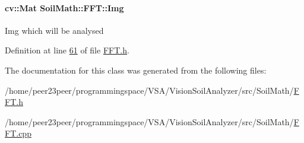 \paragraph[{Img}]{\setlength{\rightskip}{0pt plus 5cm}cv\+::\+Mat Soil\+Math\+::\+F\+F\+T\+::\+Img\hspace{0.3cm}{\ttfamily [private]}}\label{class_soil_math_1_1_f_f_t_a2efda8f90cd255a2c18352636352044f}
Img which will be analysed 

Definition at line \hyperlink{_f_f_t_8h_source_l00061}{61} of file \hyperlink{_f_f_t_8h_source}{F\+F\+T.\+h}.



The documentation for this class was generated from the following files\+:\begin{DoxyCompactItemize}
\item 
/home/peer23peer/programmingspace/\+V\+S\+A/\+Vision\+Soil\+Analyzer/src/\+Soil\+Math/\hyperlink{_f_f_t_8h}{F\+F\+T.\+h}\item 
/home/peer23peer/programmingspace/\+V\+S\+A/\+Vision\+Soil\+Analyzer/src/\+Soil\+Math/\hyperlink{_f_f_t_8cpp}{F\+F\+T.\+cpp}\end{DoxyCompactItemize}
